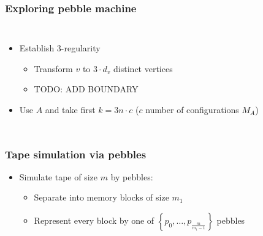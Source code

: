 \documentclass{beamer}
\begin{document}
\begin{frame}
  \frametitle{Exploring pebble machine}
  \begin{columns}
    \begin{itemize}
      \item<3-> Establish 3-regularity
        \begin{itemize}
          \item Transform $v$ to $3\cdot d_{v}$ distinct vertices
          \item TODO: ADD BOUNDARY
        \end{itemize}
      \item<5-> Use $A$ and take first $k = 3n\cdot c$ ($c$ number of
        configurations $M_{A}$)
    \end{itemize}
  \end{columns}
\end{frame}

\begin{frame}
  \frametitle{Tape simulation via pebbles}
  \begin{itemize}
    \item Simulate tape of size $m$ by pebbles:
      \begin{itemize}
        \item<3-> Separate into memory blocks of size $m_{1}$
        \item<4-> Represent every block by one of $\left\{p_{0},\dots,p_{\frac{m}{m_{1}-1}}\right\}$ pebbles
      \end{itemize}
  \end{itemize}
\end{frame}
\end{document}
